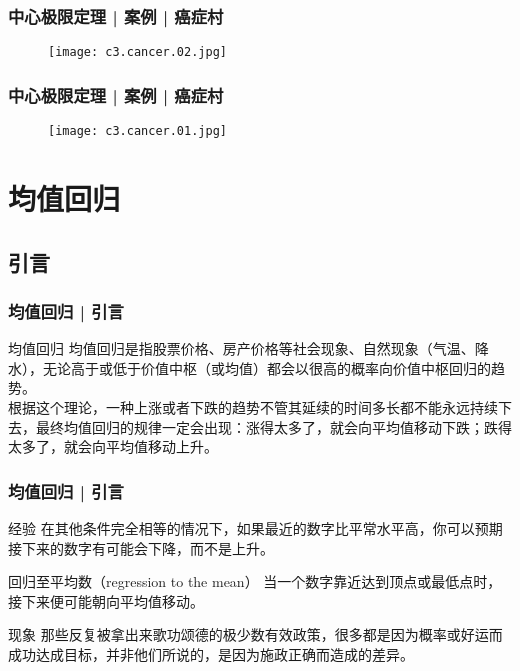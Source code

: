 \begin{frame}
  \frametitle{中心极限定理 | 案例 | 癌症村}
  \begin{figure}
    \centering
    \texttt{[image: c3.cancer.02.jpg]}
  \end{figure}
\end{frame}

\begin{frame}
  \frametitle{中心极限定理 | 案例 | 癌症村}
  \begin{figure}
    \centering
    \texttt{[image: c3.cancer.01.jpg]}
  \end{figure}
\end{frame}

\section{均值回归}
\subsection{引言}
\begin{frame}
  \frametitle{均值回归 | 引言}
  \begin{block}{均值回归}
    均值回归是指股票价格、房产价格等社会现象、自然现象（气温、降水），无论高于或低于价值中枢（或均值）都会以很高的概率向价值中枢回归的趋势。\\
    \vspace{1em}
根据这个理论，一种上涨或者下跌的趋势不管其延续的时间多长都不能永远持续下去，最终均值回归的规律一定会出现：涨得太多了，就会向平均值移动下跌；跌得太多了，就会向平均值移动上升。
  \end{block}
\end{frame}

\begin{frame}
  \frametitle{均值回归 | 引言}
  \begin{block}{经验}
    在其他条件完全相等的情况下，如果最近的数字比平常水平高，你可以预期接下来的数字有可能会下降，而不是上升。
  \end{block}
  \pause
  \begin{block}{回归至平均数（regression to the mean）}
    当一个数字靠近达到顶点或最低点时，接下来便可能朝向平均值移动。
  \end{block}
  \pause
  \begin{block}{现象}
    那些反复被拿出来歌功颂德的极少数有效政策，很多都是因为概率或好运而成功达成目标，并非他们所说的，是因为施政正确而造成的差异。
  \end{block}
\end{frame}

